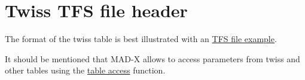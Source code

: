 
\section{Twiss TFS file header}
 
The format of the twiss table is best illustrated with an
\href{select.html#tfs}{TFS file example}.  

It should be mentioned that MAD-X allows to access parameters from twiss
and other tables using the
\href{../Introduction/expression.html#table}{table access} function.  

